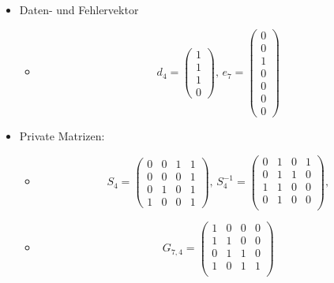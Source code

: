 \begin{itemize}
    \item Daten- und Fehlervektor
    \begin{itemize}
        \item[]
        \[d_4=
        \begin{pmatrix}
            1\\
            1\\
            1\\
            0 
        \end{pmatrix}
        ,\,
        e_7=
        \begin{pmatrix}
            0\\
            0\\
            1\\
            0\\
            0\\
            0\\
            0
        \end{pmatrix}
        \]
    \end{itemize}
    \item Private Matrizen:
    \begin{itemize}
        \item[]
        \[S_4=
            \begin{pmatrix}
                0 & 0 & 1 & 1\\
                0 & 0 & 0 & 1\\
                0 & 1 & 0 & 1\\
                1 & 0 & 0 & 1
            \end{pmatrix},\,
            S_4^{-1}=
            \begin{pmatrix}
                0 & 1 & 0 & 1\\
                0 & 1 & 1 & 0\\
                1 & 1 & 0 & 0\\
                0 & 1 & 0 & 0\\
            \end{pmatrix},
        \]
        \item[]
        \[
            G_{7,4}=
            \begin{pmatrix}
                1 & 0 & 0 & 0\\
                1 & 1 & 0 & 0\\
                0 & 1 & 1 & 0\\
                1 & 0 & 1 & 1\\

\end{pmatrix}\]
\end{itemize}
\end{itemize}

